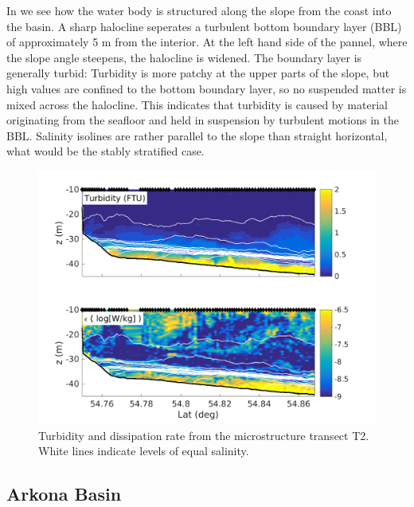In  we see how the water body is structured along the slope from 
the coast into the basin. A sharp halocline seperates a turbulent bottom 
boundary layer (BBL) of approximately 5 m from the interior. At the left hand 
side of the pannel, where the slope angle steepens, the halocline is widened. 
The boundary layer is generally turbid: Turbidity is more patchy at the upper 
parts of the slope, but high values are confined to the bottom boundary layer, 
so no suspended matter is mixed across the halocline. This indicates that 
turbidity is caused by material originating from the seafloor and held in 
suspension by turbulent motions in the BBL.
Salinity isolines are rather parallel to the slope than straight horizontal, 
what would be the stably stratified case.
  \begin{figure}[ht]
\includegraphics[width=15cm]{bilder/abtrans.png}
 \caption{Turbidity and dissipation rate from the microstructure transect T2. 
White lines indicate levels of equal salinity.}
 \label{transect}
 \end{figure}


\subsection{Arkona Basin}

